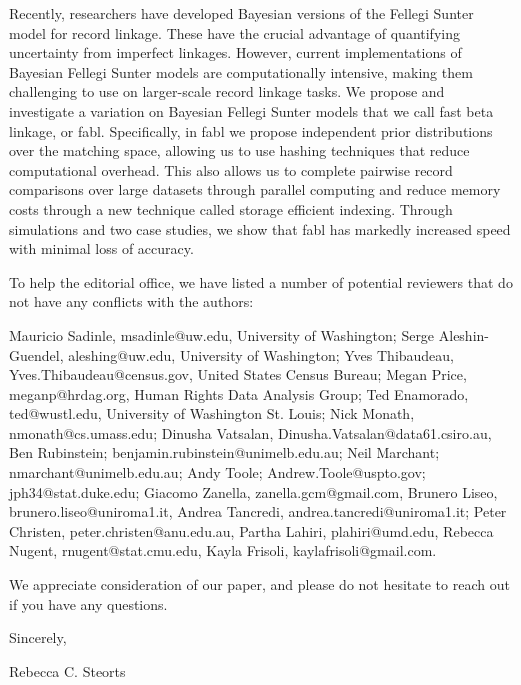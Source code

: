 \documentclass[11pt]{letter}
\begin{document}
\begin{letter}
Recently, researchers have developed Bayesian versions of the Fellegi Sunter model for record linkage. These have the crucial advantage of quantifying uncertainty from imperfect linkages. However, current implementations of Bayesian Fellegi Sunter models are computationally intensive, making them challenging to use on larger-scale record linkage tasks. We propose and investigate a variation on Bayesian Fellegi Sunter models that we call fast beta linkage, or fabl. Specifically, in fabl we propose independent prior distributions over the matching space, allowing us to use hashing techniques that reduce computational overhead. This also allows us to complete pairwise record comparisons over large datasets through parallel computing and reduce memory costs through a new technique called storage efficient indexing. Through simulations and two case studies, we show that fabl has markedly increased speed with minimal loss of accuracy.



To help the editorial office, we have listed a number of potential reviewers that do not have any conflicts with the authors:

Mauricio Sadinle, msadinle@uw.edu, University of Washington; Serge Aleshin-Guendel, aleshing@uw.edu, University of Washington; Yves Thibaudeau, Yves.Thibaudeau@census.gov, United States Census Bureau; Megan Price, meganp@hrdag.org, Human Rights Data Analysis Group; Ted Enamorado, ted@wustl.edu, University of Washington St. Louis; Nick Monath, nmonath@cs.umass.edu; Dinusha Vatsalan, Dinusha.Vatsalan@data61.csiro.au, Ben Rubinstein; benjamin.rubinstein@unimelb.edu.au; Neil Marchant; nmarchant@unimelb.edu.au; Andy Toole; Andrew.Toole@uspto.gov;  jph34@stat.duke.edu; Giacomo Zanella, zanella.gcm@gmail.com, Brunero Liseo, brunero.liseo@uniroma1.it, Andrea Tancredi, andrea.tancredi@uniroma1.it;
Peter Christen, peter.christen@anu.edu.au, Partha Lahiri, plahiri@umd.edu, Rebecca Nugent, rnugent@stat.cmu.edu, Kayla Frisoli, kaylafrisoli@gmail.com.

We appreciate consideration of our paper, and please do not hesitate to reach out if you have any questions. 



 \closing{Sincerely,}
 
 Rebecca C. Steorts
 
 


\end{letter}
\end{document}
